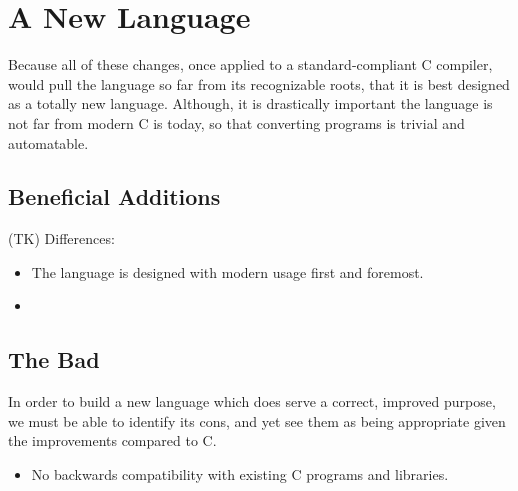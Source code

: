 \documentclass{article}
\begin{document}
\section{A New Language}
    Because all of these changes, once applied to a standard-compliant C compiler, would pull the language so far from its recognizable roots, that it is best designed as a totally new language. Although, it is drastically important the language is not far from modern C is today, so that converting programs is trivial and automatable.

\subsection{Beneficial Additions}
    (TK) Differences:
    \begin{itemize} %
        \item The language is designed with modern usage first and foremost.
        \item 
    \end{itemize}
\subsection{The Bad}
    In order to build a new language which does serve a correct, improved purpose, we must be able to identify its cons, and yet see them as being appropriate given the improvements compared to C.
    \begin{itemize}
        \item No backwards compatibility with existing C programs and libraries.
    \end{itemize}
\end{document}
